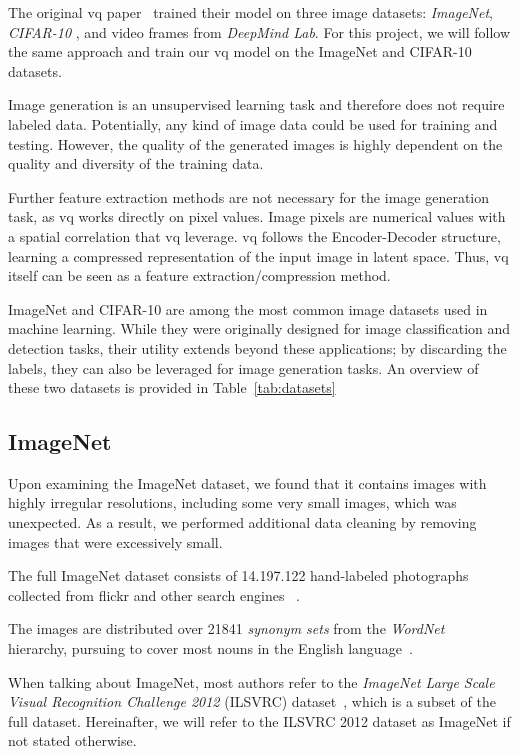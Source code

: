The original \ac{vq} paper~\cite{vqvae} trained their model on three image datasets: \textit{ImageNet}, \textit{CIFAR-10}
, and video frames from \textit{DeepMind Lab}.
For this project, we will follow the same approach and train our \ac{vq} model on the ImageNet and CIFAR-10 datasets.

Image generation is an unsupervised learning task and therefore does not require labeled data.
Potentially, any kind of image data could be used for training and testing.
However, the quality of the generated
images is highly dependent on
the quality and diversity of the training data.

Further feature extraction methods are not necessary for the image generation task, as \ac{vq} works directly on pixel
values.
Image pixels are numerical values with a spatial correlation that \ac{vq} leverage.
\ac{vq} follows the Encoder-Decoder structure, learning a compressed representation of the input image in latent space.
Thus, \ac{vq} itself can be seen as a feature extraction/compression method.

ImageNet and CIFAR-10 are among the most common image datasets used in machine learning.
While they were originally designed for image classification and detection tasks, their utility extends beyond
these applications; by discarding the labels, they can also be leveraged for image generation tasks.
An overview of these two datasets is provided in Table~\ref{tab:datasets}

\subsection{ImageNet}\label{subsec:imagenet}
Upon examining the ImageNet dataset, we found that it contains images with highly irregular resolutions, including some
very small images, which was unexpected.
As a result, we performed additional data cleaning by removing images that were excessively small.

The full ImageNet dataset consists of 14.197.122 hand-labeled photographs collected from flickr and other search engines
~\cite{ILSVRC15,imagenet_breakdown}.

The images are distributed over 21841 \textit{synonym sets} from the \textit{WordNet}~\cite{wordnet} hierarchy,
pursuing to cover most nouns in the English language~\cite{imagenet_breakdown}.

When talking about ImageNet, most authors refer to the
\textit{ImageNet Large Scale Visual Recognition Challenge 2012} (ILSVRC) dataset~\cite{ILSVRC15},
which is a subset of the full dataset.
Hereinafter, we will refer to the ILSVRC 2012 dataset as ImageNet if not stated otherwise.

